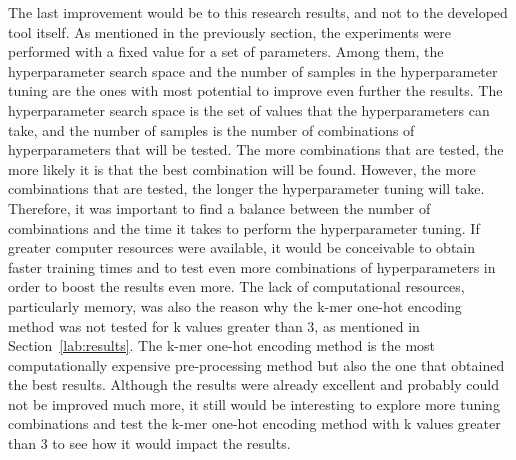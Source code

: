 The last improvement would be to this research results, and not to the developed tool itself. As mentioned in the previously section, the experiments were performed with a fixed value for a set of parameters. Among them, the hyperparameter search space and the number of samples in the hyperparameter tuning are the ones with most potential to improve even further the results. The hyperparameter search space is the set of values that the hyperparameters can take, and the number of samples is the number of combinations of hyperparameters that will be tested. The more combinations that are tested, the more likely it is that the best combination will be found. However, the more combinations that are tested, the longer the hyperparameter tuning will take. Therefore, it was important to find a balance between the number of combinations and the time it takes to perform the hyperparameter tuning. If greater computer resources were available, it would be conceivable to obtain faster training times and to test even more combinations of hyperparameters in order to boost the results even more. The lack of computational resources, particularly memory, was also the reason why the k-mer one-hot encoding method was not tested for k values greater than 3, as mentioned in Section~\ref{lab:results}. The k-mer one-hot encoding method is the most computationally expensive pre-processing method but also the one that obtained the best results. Although the results were already excellent and probably could not be improved much more, it still would be interesting to explore more tuning combinations and test the k-mer one-hot encoding method with k values greater than 3 to see how it would impact the results.